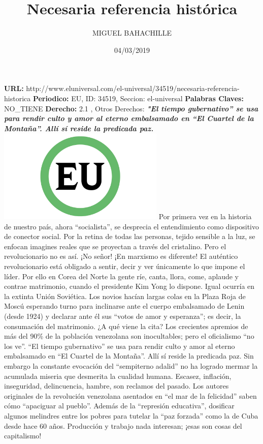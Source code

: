 \documentclass{article}%
\title{\textbf{Necesaria referencia histórica}}%
\author{MIGUEL BAHACHILLE}%
\date{04/03/2019}%
\begin{document}
%
\normalsize%
\maketitle%
\textbf{URL: }%
http://www.eluniversal.com/el{-}universal/34519/necesaria{-}referencia{-}historica\newline%
%
\textbf{Periodico: }%
EU, %
ID: %
34519, %
Seccion: %
el{-}universal\newline%
%
\textbf{Palabras Claves: }%
NO\_TIENE\newline%
%
\textbf{Derecho: }%
2.1%
, Otros Derechos: %
\newline%
%
\textbf{\textit{"El tiempo gubernativo” se usa para rendir culto y amor al eterno embalsamado en “El Cuartel de la Montaña”. Allí sí reside la predicada paz.}}%
\newline%
\newline%
%
\includegraphics[width=300px]{EU_34519.jpg}%
\newline%
%
Por primera vez en la historia de nuestro país, ahora “socialista”, se desprecia el entendimiento como dispositivo de conector social. Por la retina de todas las personas, tejido sensible a la luz, se enfocan imagines reales que se proyectan a través del cristalino. Pero el revolucionario no es así. ¡No señor! ¡En marxismo es diferente! El auténtico revolucionario está obligado a sentir, decir y ver únicamente lo que impone el líder. Por ello en Corea del Norte la gente ríe, canta, llora, come, aplaude y contrae matrimonio, cuando el presidente Kim Yong lo dispone. Igual ocurría en la extinta Unión Soviética. Los novios hacían largas colas en la Plaza Roja de Moscú esperando turno para inclinarse ante el cuerpo embalsamado de Lenin (desde 1924) y declarar ante él sus “votos de amor y esperanza”; es decir, la consumación del matrimonio.%
\newline%
%
¿A qué viene la cita?%
\newline%
%
Los crecientes apremios de más del 90\% de la población venezolana son inocultables; pero el oficialismo “no los ve”. “El tiempo gubernativo” se usa para rendir culto y amor al eterno embalsamado en “El Cuartel de la Montaña”. Allí sí reside la predicada paz. Sin embargo la constante evocación del “sempiterno adalid” no ha logrado mermar la acumulada miseria que desmerita la cualidad humana. Escasez, inflación, inseguridad, delincuencia, hambre, son reclamos del pasado. Los autores originales de la revolución venezolana asentados en “el mar de la felicidad” saben cómo “apaciguar al pueblo”. Además de la “represión educativa”, dosificar algunos melindres entre los pobres para tutelar la “paz forzada” como la de Cuba desde hace 60 años. Producción y trabajo nada interesan; ¡esas son cosas del capitalismo!%
\end{document}

